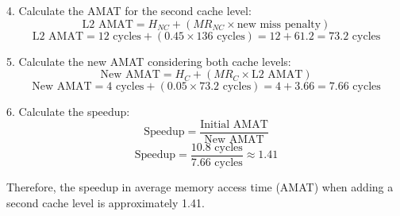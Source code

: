 4. Calculate the AMAT for the second cache level:
\[
\text{L2 AMAT} = H_{NC} + (MR_{NC} \times \text{new miss penalty})
\]
\[
\text{L2 AMAT} = 12 \text{ cycles} + (0.45 \times 136 \text{ cycles}) = 12 + 61.2 = 73.2 \text{ cycles}
\]

5. Calculate the new AMAT considering both cache levels:
\[
\text{New AMAT} = H_{C} + (MR_{C} \times \text{L2 AMAT})
\]
\[
\text{New AMAT} = 4 \text{ cycles} + (0.05 \times 73.2 \text{ cycles}) = 4 + 3.66 = 7.66 \text{ cycles}
\]

6. Calculate the speedup:
\[
\text{Speedup} = \frac{\text{Initial AMAT}}{\text{New AMAT}}
\]
\[
\text{Speedup} = \frac{10.8 \text{ cycles}}{7.66 \text{ cycles}} \approx 1.41
\]

Therefore, the speedup in average memory access time (AMAT) when adding a second cache level is approximately 1.41.
